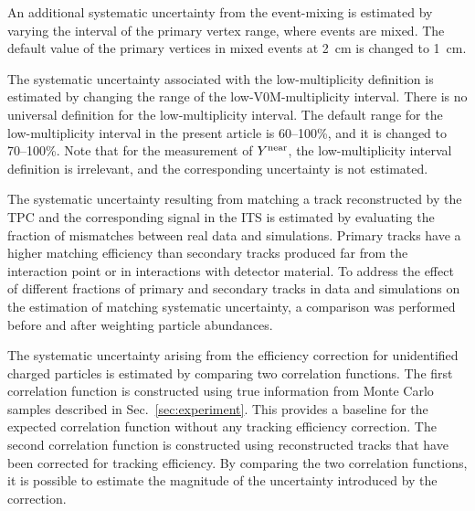 An additional systematic uncertainty from the event-mixing is estimated by varying the interval of the primary vertex range, where events are mixed. The default value of the primary vertices in mixed events at 2~cm is changed to 1~cm. 

The systematic uncertainty associated with the low-multiplicity definition is estimated by changing the range of the low-V0M-multiplicity interval. There is no universal definition for the low-multiplicity interval. The default range for the low-multiplicity interval in the present article is 60--100\%, and it is changed to 70--100\%. 
Note that for the measurement of $Y^{\rm{near}}$, the low-multiplicity interval definition is irrelevant, and the corresponding uncertainty is not estimated. 

The systematic uncertainty resulting from matching a track reconstructed by the TPC and the corresponding signal in the ITS is estimated by evaluating the fraction of mismatches between real data and simulations. Primary tracks have a higher matching efficiency than secondary tracks produced far from the interaction point or in interactions with detector material. To address the effect of different fractions of primary and secondary tracks in data and simulations on the estimation of matching systematic uncertainty, a comparison was performed before and after weighting particle abundances.

The systematic uncertainty arising from the efficiency correction for unidentified charged particles is estimated by comparing two correlation functions. The first correlation function is constructed using true information from Monte Carlo samples described in Sec.~\ref{sec:experiment}. This provides a baseline for the expected correlation function without any tracking efficiency correction. The second correlation function is constructed using reconstructed tracks that have been corrected for tracking efficiency. By comparing the two correlation functions, it is possible to estimate the magnitude of the uncertainty introduced by the correction. 


